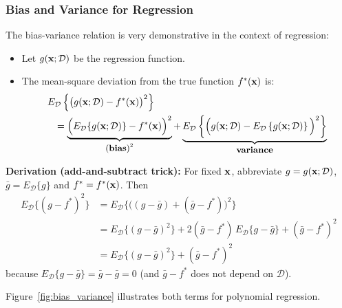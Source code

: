\subsubsection{Bias and Variance for Regression}

  The bias-variance relation is very demonstrative in the context of regression:
  
  \begin{itemize}
    \item Let $g(\bm{\mathrm{x}} ; {\mathcal{D}})$ be the regression function.            
    \item The mean-square deviation from the true function $f^*(\bm{\mathrm{x}})$ is:
      \begin{eqnarray*}
         \lefteqn{E_{\mathcal{D}} \left\{ \big(g(\vect x; {\mathcal{D}}) - f^*(\vect x)\big)^2 \right\}} \\
         & & = \underbrace{\Big(E_{\mathcal{D}} \{g(\vect x ; {\mathcal{D}})\} - f^*(\vect x) \Big)^2}_{\mbox{\small (\textbf{bias})}^2} + 
               \underbrace{E_{\mathcal{D}} \left\{ \Big(g(\vect x; {\mathcal{D}}) - E_{\mathcal{D}} \left\{ g(\vect x; {\mathcal{D}} ) \right\} \Big)^2 \right\}}_{\mbox{\small \textbf{variance}}}
      \end{eqnarray*}
  \end{itemize}

  \textbf{Derivation (add-and-subtract trick):} For fixed $\bm{\mathrm{x}}$, abbreviate
  $g=g(\bm{\mathrm{x}};\mathcal D)$, $\bar g = E_{\mathcal D}\{g\}$ and $f^*=f^*(\bm{\mathrm{x}})$. Then
  {\small
  \begin{align*}
    E_{\mathcal D}\{(g-f^*)^2\}
      &= E_{\mathcal D}\{\big((g-\bar g)+(\bar g-f^*)\big)^2\}\\
      &= E_{\mathcal D}\{(g-\bar g)^2\} + 2(\bar g-f^*)\,E_{\mathcal D}\{g-\bar g\} + (\bar g-f^*)^2\\
      &= E_{\mathcal D}\{(g-\bar g)^2\} + (\bar g-f^*)^2
  \end{align*}
  }
  because $E_{\mathcal D}\{g-\bar g\}=\bar g-\bar g=0$ (and $\bar g-f^*$ does not depend on $\mathcal D$).

  Figure~\ref{fig:bias_variance} illustrates both terms for polynomial regression.

